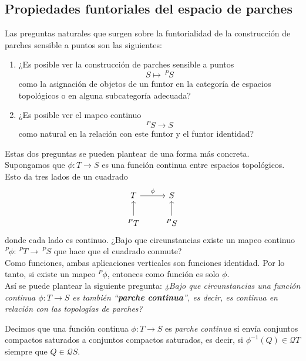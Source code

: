 \subsection{Propiedades funtoriales del espacio de parches}\label{P. funtoriales spuntos}

Las preguntas naturales que surgen sobre la funtorialidad de la construcción de parches sensible a puntos son las siguientes:

\begin{enumerate}
    \item ¿Es posible ver la construcción de parches sensible a puntos 
    \[
    S\mapsto\, ^PS
    \]
    como la asignación de objetos de un funtor en la categoría de espacios topológicos o en alguna subcategoría adecuada?

    \item ¿Es posible ver el mapeo continuo 
    \[
    ^PS\to S
    \]
    como natural en la relación con este funtor y el funtor identidad?
\end{enumerate}

Estas dos preguntas se pueden plantear de una forma más concreta.\\

Supongamos que $\phi \colon T\to S$ es una función continua entre espacios topológicos. Esto da tres lados de un cuadrado
\[\begin{tikzcd}
	T & S \\
	{^PT} & {^PS}
	\arrow["\phi", from=1-1, to=1-2]
	\arrow[from=2-1, to=1-1]
	\arrow[from=2-2, to=1-2]
\end{tikzcd}\]
donde cada lado es continuo. ¿Bajo que circunstancias existe un mapeo continuo $^P\phi \colon \,^PT\to \,^PS$ que hace que el cuadrado conmute?\\

Como funciones, ambas aplicaciones verticales son funciones identidad. Por lo tanto, si existe un mapeo $^P\phi$, entonces como función es solo $\phi$.\\

Así se puede plantear la siguiente pregunta: \emph{¿Bajo que circunstancias una función continua $\phi\colon T\to S$ es también ``\textbf{parche continua}'', es decir, es continua en relación con las topologías de parches?}

\begin{dfn}\label{Parchecontinua}
    Decimos que una función continua $\phi\colon T\to S$ es \emph{parche continua} si envía conjuntos compactos saturados a conjuntos compactos saturados, es decir, si $\phi ^{-1}(Q)\in \mathcal{Q}T$ siempre que $Q\in \mathcal{Q}S$. 
\end{dfn}

